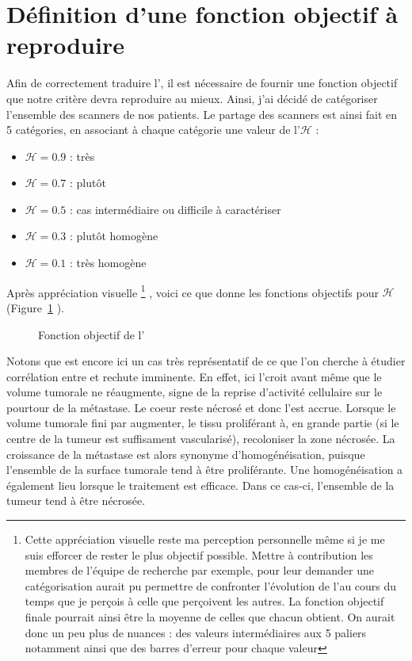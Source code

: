 \documentclass[main.tex]{subfiles}
\begin{document}
\section{Définition d'une fonction objectif à reproduire}
Afin de correctement traduire l'\hetero, il est nécessaire de fournir une fonction objectif que notre critère devra reproduire au mieux. Ainsi, j'ai décidé de catégoriser l'ensemble des scanners de nos patients. Le partage des scanners est ainsi fait en 5 catégories, en associant à chaque catégorie une valeur de l'\hetero $\mathscr{H}$ :
\begin{itemize}
\item $\mathscr{H}=0.9$ : très \heterogene
\item $\mathscr{H}=0.7$ : plutôt \heterogene
\item $\mathscr{H}=0.5$ : cas intermédiaire ou difficile à caractériser
\item $\mathscr{H}=0.3$ : plutôt homogène
\item  $\mathscr{H}=0.1$ : très homogène
\end{itemize}
Après appréciation visuelle \footnote{\samepage Cette appréciation visuelle reste ma perception personnelle même si je me suis efforcer de rester le plus objectif possible. Mettre à contribution les membres de l'équipe de recherche par exemple, pour leur demander une catégorisation aurait pu permettre de confronter l'évolution de l'\hetero au cours du temps que je perçois à celle que perçoivent les autres. La fonction objectif finale pourrait ainsi être la moyenne de celles que chacun obtient. On aurait donc un peu plus de nuances : des valeurs intermédiaires aux 5 paliers notamment ainsi que des barres d'erreur pour chaque valeur}
, voici ce que donne les fonctions objectifs pour $\mathscr{H}$ (\cf  Figure~\ref{fig:hetero_visuelle} ).

\begin{figure}
\caption{\label{fig:hetero_visuelle}Fonction objectif de l'\hetero}
\end{figure}

Notons que \Nber est encore ici un cas très représentatif de ce que l'on cherche à étudier \ie corrélation entre \hetero et rechute imminente. En effet, ici l'\hetero croit avant même que le volume tumorale ne réaugmente, signe de la reprise d'activité cellulaire sur le pourtour de la métastase. Le coeur reste nécrosé et donc l'\hetero est accrue. Lorsque le volume tumorale fini par augmenter, le tissu proliférant à, en grande partie (si le centre de la tumeur est suffisament vascularisé), recoloniser la zone nécrosée. La croissance de la métastase est alors synonyme d'homogénéisation, puisque l'ensemble de la surface tumorale tend à être proliférante. Une homogénéisation a également lieu lorsque le traitement est efficace. Dans ce cas-ci, l'ensemble de la tumeur tend à être nécrosée.
\end{document}
